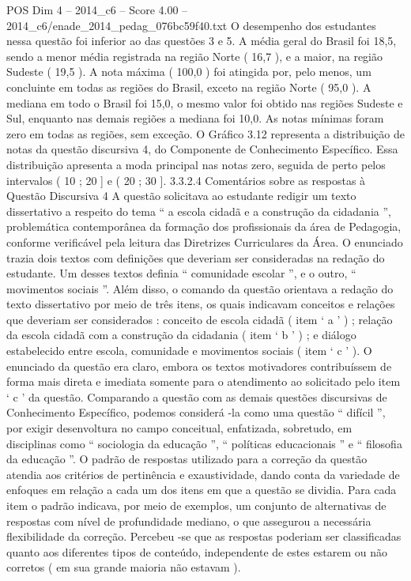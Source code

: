 \begin{textsample}{POS Dim 4 – 2014\_c6 – Score 4.00 – 2014\_c6/enade\_2014\_pedag\_076bc59f40.txt}
O desempenho dos estudantes nessa questão foi inferior ao das questões 3 e 5.
A média geral do Brasil foi 18,5, sendo a menor média registrada na região Norte ( 16,7 ), e a maior, na região Sudeste ( 19,5 ).
A nota máxima ( 100,0 ) foi atingida por, pelo menos, um concluinte em todas as regiões do Brasil, exceto na região Norte ( 95,0 ).
A mediana em todo o Brasil foi 15,0, o mesmo valor foi obtido nas regiões Sudeste e Sul, enquanto nas demais regiões a mediana foi 10,0.
As notas mínimas foram zero em todas as regiões, sem exceção.
O Gráfico 3.12 representa a distribuição de notas da questão discursiva 4, do Componente de Conhecimento Específico.
Essa distribuição apresenta a moda principal nas notas zero, seguida de perto pelos intervalos ( 10 ; 20 ] e ( 20 ; 30 ]. 3.3.2.4 Comentários sobre as respostas à Questão Discursiva 4 A questão solicitava ao estudante redigir um texto dissertativo a respeito do tema “ a escola cidadã e a construção da cidadania ”, problemática contemporânea da formação dos profissionais da área de Pedagogia, conforme verificável pela leitura das Diretrizes Curriculares da Área.
O enunciado trazia dois textos com definições que deveriam ser consideradas na redação do estudante.
Um desses textos definia “ comunidade escolar ”, e o outro, “ movimentos sociais ”.
Além disso, o comando da questão orientava a redação do texto dissertativo por meio de três itens, os quais indicavam conceitos e relações que deveriam ser considerados : conceito de escola cidadã ( item ‘ a ’ ) ; relação da escola cidadã com a construção da cidadania ( item ‘ b ’ ) ; e diálogo estabelecido entre escola, comunidade e movimentos sociais ( item ‘ c ’ ).
O enunciado da questão era claro, embora os textos motivadores contribuíssem de forma mais direta e imediata somente para o atendimento ao solicitado pelo item ‘ c ’ da questão.
Comparando a questão com as demais questões discursivas de Conhecimento Específico, podemos considerá -la como uma questão “ difícil ”, por exigir desenvoltura no campo conceitual, enfatizada, sobretudo, em disciplinas como “ sociologia da educação ”, “ políticas educacionais ” e “ filosofia da educação ”.
O padrão de respostas utilizado para a correção da questão atendia aos critérios de pertinência e exaustividade, dando conta da variedade de enfoques em relação a cada um dos itens em que a questão se dividia.
Para cada item o padrão indicava, por meio de exemplos, um conjunto de alternativas de respostas com nível de profundidade mediano, o que assegurou a necessária flexibilidade da correção.
Percebeu -se que as respostas poderiam ser classificadas quanto aos diferentes tipos de conteúdo, independente de estes estarem ou não corretos ( em sua grande maioria não estavam ).

\end{textsample}
